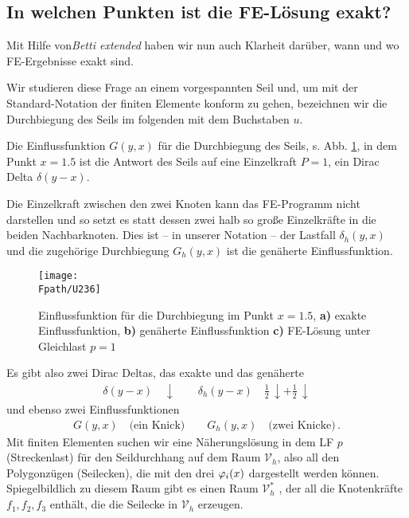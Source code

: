 {\textcolor{sectionTitleBlue}{\section{In welchen Punkten ist die FE-L\"{o}sung exakt?}}
Mit Hilfe von{\em Betti extended\/} haben wir nun auch Klarheit dar\"{u}ber, wann und wo FE-Ergebnisse exakt sind.

Wir studieren diese Frage an einem vorgespannten Seil und, um mit der Standard-Notation der finiten Elemente konform zu gehen, bezeichnen wir die Durchbiegung des Seils im folgenden mit dem Buchstaben $u$.

Die Einflussfunktion $G(y,x)$ f\"{u}r die Durchbiegung des Seils, s. Abb. \ref{U236}, in dem Punkt $x = 1.5$ ist die Antwort des Seils auf eine Einzelkraft $P = 1$, ein Dirac Delta $\delta(y-x)$.

Die Einzelkraft zwischen den zwei Knoten kann das FE-Programm nicht darstellen und so setzt es statt dessen zwei halb so gro{\ss}e Einzelkr\"{a}fte in die beiden Nachbarknoten. Dies ist -- in unserer Notation -- der Lastfall $\delta_h(y,x)$ und die zugeh\"{o}rige Durchbiegung $G_h(y,x)$ ist die gen\"{a}herte Einflussfunktion.

\begin{figure}[tbp]
\centering
\if {} \sidecaption \fi
\texttt{[image: \\Fpath/U236]}
\caption{Einflussfunktion f\"{u}r die Durchbiegung im Punkt $x = 1.5$, \textbf{ a)} exakte Einflussfunktion, \textbf{ b)} gen\"{a}herte Einflussfunktion \textbf{ c)}
FE-L\"{o}sung unter Gleichlast $p = 1$} \label{U236}
\end{figure}%

Es gibt also zwei Dirac Deltas, das exakte und das gen\"{a}herte
\begin{align}
\delta(y-x)  \quad \downarrow  \qquad \delta_h(y-x) \quad \frac{1}{2}\,\downarrow  + \frac{1}{2}\,\downarrow
\end{align}
und ebenso zwei Einflussfunktionen
\begin{align} \label{Eq49}
G(y,x) \quad \text{(ein Knick)} \qquad G_h(y,x) \quad \text{(zwei Knicke)} \,.
\end{align}
Mit finiten Elementen suchen wir eine N\"{a}herungsl\"{o}sung in dem LF $p$ (Streckenlast) f\"{u}r den Seildurchhang auf dem Raum $\mathcal{V}_h$, also all den Polygonz\"{u}gen (Seilecken), die mit den drei $\varphi_i(x)$ dargestellt werden k\"{o}nnen. Spiegelbildlich zu diesem Raum gibt es einen Raum $\mathcal{V}_h^*$
, der all die Knotenkr\"{a}fte $f_1, f_2, f_3$ enth\"{a}lt, die die Seilecke in $\mathcal{V}_h$ erzeugen.

}
